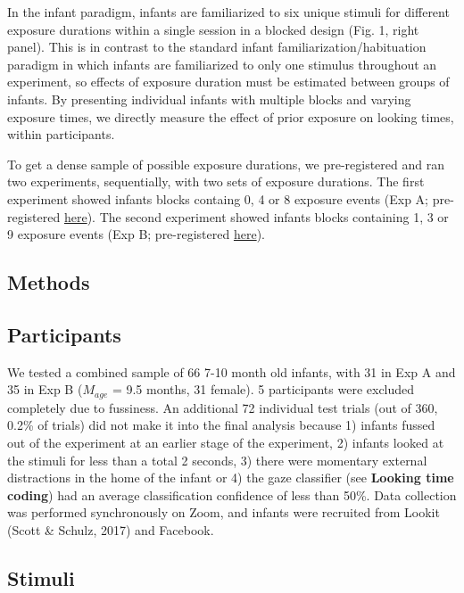 \documentclass[10pt, letterpaper]{article}
\begin{document}
In the infant paradigm, infants are familiarized to six unique stimuli
for different exposure durations within a single session in a blocked
design (Fig. 1, right panel). This is in contrast to the standard infant
familiarization/habituation paradigm in which infants are familiarized
to only one stimulus throughout an experiment, so effects of exposure
duration must be estimated between groups of infants. By presenting
individual infants with multiple blocks and varying exposure times, we
directly measure the effect of prior exposure on looking times, within
participants.

To get a dense sample of possible exposure durations, we pre-registered
and ran two experiments, sequentially, with two sets of exposure
durations. The first experiment showed infants blocks containg 0, 4 or 8
exposure events (Exp A; pre-registered
\href{https://osf.io/gux4f/?view_only=b4d6d0118dfa41a79fb431d389f4fecc}{here}).
The second experiment showed infants blocks containing 1, 3 or 9
exposure events (Exp B; pre-registered
\href{https://osf.io/w6pgu/?view_only=39ee108159884761a0c5bc68d11918df}{here}).

\hypertarget{methods-1}{%
\subsection{Methods}\label{methods-1}}

\hypertarget{participants-1}{%
\subsection{Participants}\label{participants-1}}

We tested a combined sample of 66 7-10 month old infants, with 31 in Exp
A and 35 in Exp B (\(M_{age}\) = 9.5 months, 31 female). 5 participants
were excluded completely due to fussiness. An additional 72 individual
test trials (out of 360, 0.2\% of trials) did not make it into the final
analysis because 1) infants fussed out of the experiment at an earlier
stage of the experiment, 2) infants looked at the stimuli for less than
a total 2 seconds, 3) there were momentary external distractions in the
home of the infant or 4) the gaze classifier (see \textbf{Looking time
coding}) had an average classification confidence of less than 50\%.
Data collection was performed synchronously on Zoom, and infants were
recruited from Lookit (Scott \& Schulz, 2017) and Facebook.

\hypertarget{stimuli-1}{%
\subsection{Stimuli}\label{stimuli-1}}
\end{document}
